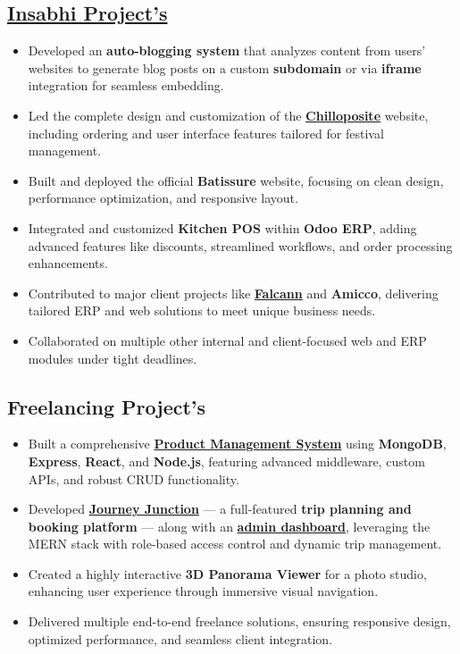 \subsection{{\href{https://www.insabhi.com}{Insabhi Project's} \hfill}}
{\color{black}%
\begin{itemize}[itemsep=0.1em, parsep=0pt, topsep=0pt]
\item Developed an \textbf{auto-blogging system} that analyzes content from users’ websites to generate blog posts on a custom \textbf{subdomain} or via \textbf{iframe} integration for seamless embedding.
\item Led the complete design and customization of the \href{https://chillopositefestival.com/}{\textbf{Chilloposite}} website, including ordering and user interface features tailored for festival management.
\item Built and deployed the official \textbf{Batissure} website, focusing on clean design, performance optimization, and responsive layout.
\item Integrated and customized \textbf{Kitchen POS} within \textbf{Odoo ERP}, adding advanced features like discounts, streamlined workflows, and order processing enhancements.
\item Contributed to major client projects like \href{https://falcann.com/}{\textbf{Falcann}} and \textbf{Amicco}, delivering tailored ERP and web solutions to meet unique business needs.
\item Collaborated on multiple other internal and client-focused web and ERP modules under tight deadlines.
\end{itemize}%
}


\subsection{{Freelancing Project's \hfill }}
{\color{black}%
\begin{itemize}[itemsep=0.1em, parsep=0pt, topsep=0pt]
\item Built a comprehensive \href{https://ujjwal-dresses.onrender.com/}{\textbf{Product Management System}} using \textbf{MongoDB}, \textbf{Express}, \textbf{React}, and \textbf{Node.js}, featuring advanced middleware, custom APIs, and robust CRUD functionality.
\item Developed \href{https://journey-junction-hy4h.onrender.com/}{\textbf{Journey Junction}} — a full-featured \textbf{trip planning and booking platform} — along with an \href{https://journey-junction-admin-react.onrender.com}{\textbf{admin dashboard}}, leveraging the MERN stack with role-based access control and dynamic trip management.
\item Created a highly interactive \textbf{3D Panorama Viewer} for a photo studio, enhancing user experience through immersive visual navigation.
\item Delivered multiple end-to-end freelance solutions, ensuring responsive design, optimized performance, and seamless client integration.
\end{itemize}%
}


